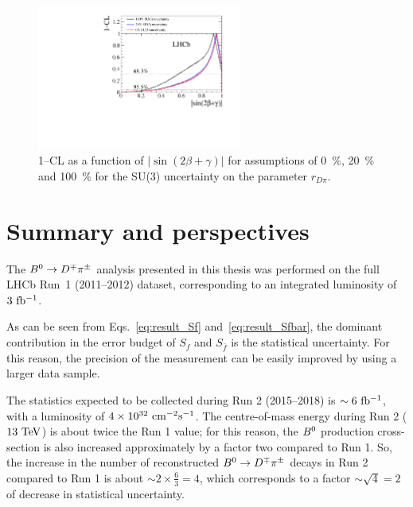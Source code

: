 \begin{figure}[t]
\centering
	\includegraphics[width=0.6\textwidth]{07Results/figs/su3_scan_sin2b_plus_gamma.pdf}
	\vspace{-2mm}
        \caption{1--CL as a function of $|\sin(2\beta+\gamma)|$ for assumptions of \SI{0}{\percent}, \SI{20}{\percent} and \SI{100}{\percent}
  for the SU(3) uncertainty on the parameter $r_{D\pi}$.}
	\label{fig:SU3_gammaCombo_sin2b+g}
\end{figure}


\section{Summary and perspectives}
\label{sec:outlook}

The $B^0\rightarrow D^\mp\pi^\pm$ analysis presented in this thesis was performed on the full LHCb Run~1 (2011--2012) dataset,
corresponding to an integrated luminosity of $3~\rm fb^{-1}$.

As can be seen from Eqs.~\ref{eq:result_Sf} and~\ref{eq:result_Sfbar}, 
the dominant contribution in the error budget of $S_f$ and $S_{\bar f}$ is the statistical uncertainty.
For this reason, the precision of the measurement can be easily improved by using a larger data sample.

The statistics expected to be collected during Run 2 (2015--2018) is $\sim 6~\rm fb^{-1}$, with a luminosity of $4\times 10^{32}~\rm cm^{-2}s^{-1}$.
The centre-of-mass energy during Run 2 ($13~\rm TeV$) is about twice the Run 1 value; for this reason, the $B^0$ production cross-section
is also increased approximately by a factor two compared to Run 1. So, the increase in the number of reconstructed $B^0\rightarrow D^\mp\pi^\pm$ decays in Run 2 compared
to Run 1 is about $\sim 2\times \frac{6}{3} = 4$, which corresponds to a factor $\sim \sqrt{4}=2$ of decrease in statistical uncertainty.
 
